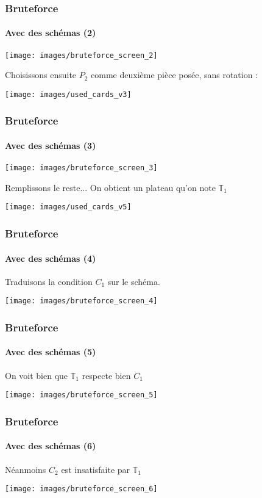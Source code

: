 \documentclass{beamer}
\begin{document}
\begin{frame}
	\frametitle{Bruteforce}
	\framesubtitle{Avec des schémas (2) }
		\begin{center}
			\texttt{[image: images/bruteforce\_screen\_2]}
		\end{center}
	\footnotesize
	Choisissons ensuite $P_2$ comme deuxième pièce posée, sans rotation : 
	
	\begin{center}
		\texttt{[image: images/used\_cards\_v3]}
	\end{center}
	
		
\end{frame}

\begin{frame}
	\frametitle{Bruteforce}
	\framesubtitle{Avec des schémas (3)}
	\begin{center}
			\texttt{[image: images/bruteforce\_screen\_3]}
		\end{center}
	\footnotesize
	 Remplissons le reste... On obtient un plateau qu'on note $\mathbb{T}_1$
	
	\begin{center}
		\texttt{[image: images/used\_cards\_v5]}
	\end{center}
\end{frame}

\begin{frame}
	\frametitle{Bruteforce}
	\framesubtitle{Avec des schémas (4) }
	Traduisons la condition \color{red}$C_1$\color{black} sur le schéma.
	\begin{center}
		\texttt{[image: images/bruteforce\_screen\_4]}
	\end{center}
\end{frame}

\begin{frame}
	\frametitle{Bruteforce}
	\framesubtitle{Avec des schémas (5)}
	On voit bien que $\mathbb{T}_1$ respecte bien \color{red}$C_1$\color{black}
		\begin{center}
			\texttt{[image: images/bruteforce\_screen\_5]}
		\end{center}
\end{frame}

\begin{frame}
	\frametitle{Bruteforce}
	\framesubtitle{Avec des schémas (6)}
	Néanmoins \color{orange}$C_2$ \color{black}  est insatisfaite par $\mathbb{T}_1$
		\begin{center}
			\texttt{[image: images/bruteforce\_screen\_6]}
		\end{center}
\end{frame}
\end{document}
